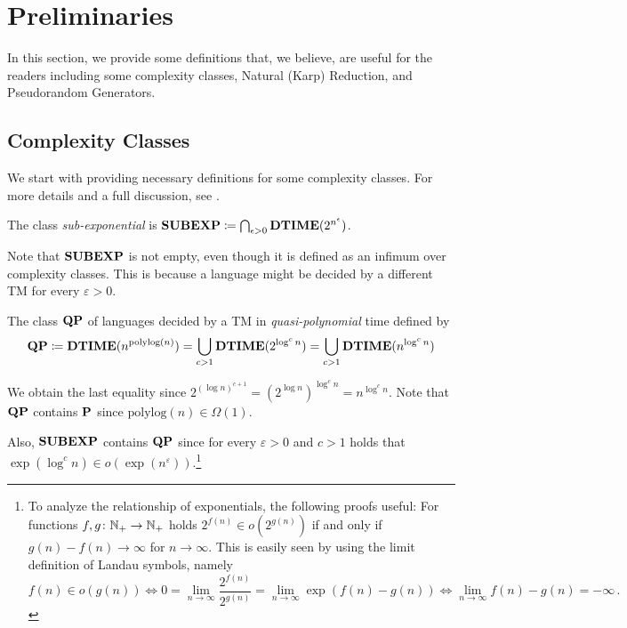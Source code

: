 \documentclass[11pt]{article}
\begin{document}
\section{Preliminaries}

In this section, we provide some definitions that, we believe, are useful for the readers including some complexity classes, Natural (Karp) Reduction, and Pseudorandom Generators.

\subsection{Complexity Classes}
We start with providing necessary definitions for some complexity classes.
For more details and a full discussion, see \cite{arora2009}.

\begin{definition}
  The class \emph{sub-exponential} is
  $\class{SUBEXP} \coloneqq \bigcap_{\epsilon > 0} \TIME(2^{n^{\epsilon}})$.
\end{definition}

Note that $\class{SUBEXP}$ is not empty, even though it is defined as an infimum
over complexity classes. This is because a language might be decided by a
different TM for every $\varepsilon > 0$.

\begin{definition}
	The class $\class{QP}$ of languages decided by a TM in
	\emph{quasi-polynomial} time defined by
	\[
	\class{QP}
	\coloneqq
	\TIME(n^{\mathrm{polylog}(n)})
	=
	\bigcup_{c > 1}\TIME(2^{\log^c n})
	=
	\bigcup_{c > 1}\TIME(n^{\log^c n})
	\]
\end{definition}
We obtain the last equality since
$2^{(\log n)^{c+1}} = (2^{\log n})^{\log^c n} = n^{\log^c n}$.
%
Note that $\class{QP}$ contains $\P$ since
$\mathrm{polylog}(n) \in \Omega(1)$.

Also, $\class{SUBEXP}$ contains $\class{QP}$ since for every
$\varepsilon > 0$ and $c > 1$ holds that
$\exp(\log^c n) \in o(\exp(n^\varepsilon))$.\footnote{To analyze the
relationship of exponentials, the following proofs useful:
For functions $f, g \colon \N_+ \to \N_+$ holds
$2^{f(n)} \in o(2^{g(n)})$ if and only if $g(n) - f(n) \to \infty$ for
$n \to \infty$.
This is easily seen by using the limit definition of Landau symbols, namely
\[
  f(n) \in o(g(n))
  \iff
  0 = \lim_{n \to \infty} \frac{2^{f(n)}}{2^{g(n)}}
  = \lim_{n \to \infty} \exp(f(n) - g(n))
  \iff
  \lim_{n \to \infty} f(n) - g(n) = -\infty \,.
\]}
\end{document}
